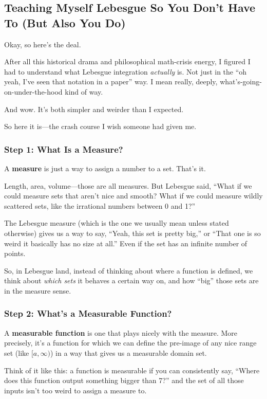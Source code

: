 \subsection{Teaching Myself Lebesgue So You Don’t Have To (But Also You Do)}

Okay, so here's the deal.

After all this historical drama and philosophical math-crisis energy, I figured I had to understand what Lebesgue integration \textit{actually} is. Not just in the “oh yeah, I’ve seen that notation in a paper” way. I mean really, deeply, what’s-going-on-under-the-hood kind of way.

And wow. It’s both simpler and weirder than I expected.

So here it is—the crash course I wish someone had given me.

\subsubsection{Step 1: What Is a Measure?}

A \textbf{measure} is just a way to assign a number to a set. That’s it.

Length, area, volume—those are all measures. But Lebesgue said, “What if we could measure sets that aren’t nice and smooth? What if we could measure wildly scattered sets, like the irrational numbers between 0 and 1?”

The Lebesgue measure (which is the one we usually mean unless stated otherwise) gives us a way to say, “Yeah, this set is pretty big,” or “That one is so weird it basically has no size at all.” Even if the set has an infinite number of points.

So, in Lebesgue land, instead of thinking about where a function is defined, we think about \textit{which sets} it behaves a certain way on, and how “big” those sets are in the measure sense.

\subsubsection{Step 2: What’s a Measurable Function?}

A \textbf{measurable function} is one that plays nicely with the measure. More precisely, it's a function for which we can define the pre-image of any nice range set (like \([a, \infty)\)) in a way that gives us a measurable domain set.

Think of it like this: a function is measurable if you can consistently say, “Where does this function output something bigger than 7?” and the set of all those inputs isn’t too weird to assign a measure to.

